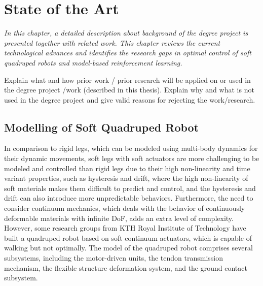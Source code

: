 \chapter{State of the Art}
\label{chap2}
\textit{In this chapter, a detailed description about background of the degree project is presented together with related work. This chapter reviews the current technological advances and identifies the research gaps in optimal control of soft quadruped robots and model-based reinforcement learning.}

Explain what and how prior work / prior research will be applied on or used in the degree project /work (described in this thesis). Explain why and what is not used in the degree project and give valid reasons for rejecting the work/research.

\section{Modelling of Soft Quadruped Robot}
 In comparison to rigid legs, which can be modeled using multi-body dynamics for their dynamic movements, soft legs with soft actuators are more challenging to be modeled and controlled than rigid legs due to their high non-linearity\cite{slotineAppliedNonlinearControl1991} and time variant properties\cite{wangControlStrategiesSoft2022}, such as hysteresis and drift, where the high non-linearity of soft materials makes them difficult to predict and control, and the hysteresis and drift can also introduce more unpredictable behaviors. Furthermore, the need to consider continuum mechanics, which deals with the behavior of continuously deformable materials with infinite \ac{DoF}\cite{polygerinosSoftRoboticsReview2017}, adds an extra level of complexity. However, some research groups from KTH Royal Institute of Technology\cite{jiSynthesizingOptimalGait2022,daneliaStructureGaitOptimizationof2021,thorapallimuralidharanContinuumActuatorBased2020,jiLearningbasedControl4D} have built a quadruped robot based on soft continuum actuators, which is capable of walking but not optimally. The model of the quadruped robot comprises several subsystems, including the motor-driven units, the tendon transmission mechanism, the flexible structure deformation system, and the ground contact subsystem.
 
